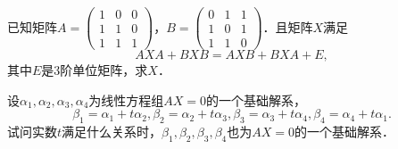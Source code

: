 \documentclass[plain,noanswer,medmath]{../../template/jnuexam}
\begin{document}

\begin{problem}
已知矩阵$A = \begin{pmatrix}
  1 & 0 & 0 \\
  1 & 1 & 0 \\
  1 & 1 & 1
\end{pmatrix}$，$B = \begin{pmatrix}
  0 & 1 & 1 \\
  1 & 0 & 1 \\
  1 & 1 & 0
\end{pmatrix}$．且矩阵$X$满足
$$AXA + BXB = AXB + BXA + E,$$
其中$E$是$3$阶单位矩阵，求$X$．
\end{problem}



\begin{problem}
设$\alpha_1,\alpha_2,\alpha_3,\alpha_4$为线性方程组$AX = 0$的一个基础解系，
$$\beta_1 = \alpha_1 + t\alpha_2,\beta_2 = \alpha_2 + t\alpha_3,\beta_3 = \alpha_3 + t\alpha_4,\beta_4 = \alpha_4 + t\alpha_1.$$
试问实数$t$满足什么关系时，$\beta_1,\beta_2,\beta_3,\beta_4$也为$AX = 0$的一个基础解系．
\end{problem}
\end{document}
